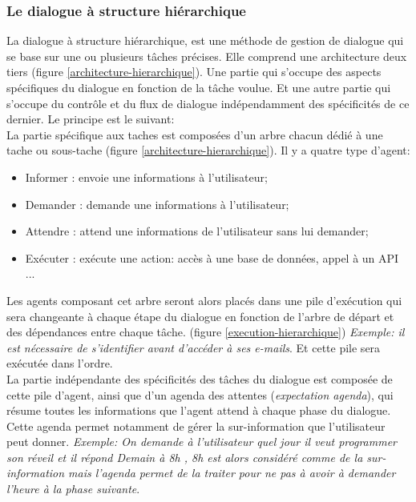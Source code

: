 \subsubsection{Le dialogue à structure hiérarchique}
La dialogue à structure hiérarchique, est une méthode de gestion de dialogue qui se base sur une ou plusieurs tâches précises. Elle comprend une architecture deux tiers (figure \ref{architecture-hierarchique}). Une partie qui s'occupe des aspects spécifiques du dialogue en fonction de la tâche voulue. Et une autre partie qui s'occupe du contrôle et du flux de dialogue indépendamment des spécificités de ce dernier. Le principe est le suivant: \\
La partie spécifique aux taches est composées d'un arbre chacun dédié à une tache ou sous-tache (figure \ref{architecture-hierarchique}). Il y a quatre type d'agent:
\begin{itemize}
	\item Informer : envoie une informations à l'utilisateur;
	\item Demander : demande une informations à l'utilisateur;
	\item Attendre : attend une informations de l'utilisateur sans lui demander;
	\item Exécuter : exécute une action: accès à une base de données, appel à un API ...  
\end{itemize} 
Les agents composant cet arbre seront alors placés dans une pile d'exécution qui sera changeante à chaque étape du dialogue en fonction de l'arbre de départ et des dépendances entre chaque tâche. (figure \ref{execution-hierarchique}) \textit{Exemple: il est nécessaire de s'identifier avant d'accéder à ses e-mails}. Et cette pile sera exécutée dans l'ordre.\\
La partie indépendante des spécificités des tâches du dialogue est composée de cette pile d'agent, ainsi que d'un agenda des attentes (\textit{expectation agenda}), qui résume toutes les informations que l'agent attend à chaque phase du dialogue. Cette agenda permet notamment de gérer la sur-information que l'utilisateur peut donner. \textit{Exemple: On demande à l'utilisateur quel jour il veut programmer son réveil et il répond \og Demain à 8h \fg, 8h est alors considéré comme de la sur-information mais l'agenda permet de la traiter pour ne pas à avoir à demander l'heure à la phase suivante}.


\FloatBarrier
 
 
 
